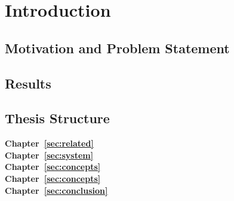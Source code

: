 %
\chapter{Introduction}
\label{sec:intro}



\section{Motivation and Problem Statement}
\label{sec:intro:motivation}


\section{Results}
\label{sec:intro:results}


\section{Thesis Structure}
\label{sec:intro:structure}

\textbf{Chapter~\ref{sec:related}} \\[0.2em]

\textbf{Chapter~\ref{sec:system}} \\[0.2em]

\textbf{Chapter~\ref{sec:concepts}} \\[0.2em]

\textbf{Chapter~\ref{sec:concepts}} \\[0.2em]

\textbf{Chapter~\ref{sec:conclusion}} \\[0.2em]
